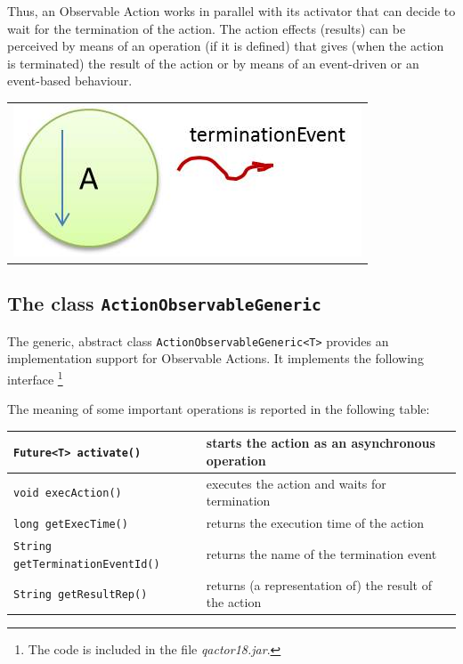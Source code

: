 Thus, an Observable Action works in parallel with its activator that can decide to wait for the termination of the action. The action effects (results) can be perceived by means of an operation (if it is defined) that gives (when the action is terminated) the result of the action or by means of an event-driven or an event-based behaviour.

\begin{center}
\begin{tabular}{ c }
     \includegraphics[scale = 0.5]{img/actionObservable.jpg}\\
\end{tabular}{   }
\end{center}
 

\subsection{The class \texttt{ActionObservableGeneric}}

The generic, abstract class \texttt{ActionObservableGeneric<T>} provides an implementation support for Observable Actions. It implements the following interface \footnote{The code is included in the file \textit{qactor18.jar}.}  



The meaning of some important operations is reported in the following table:

\medskip 
\begin{tabular}{|l|l|}
\hline 
\texttt{Future<T> activate()} & starts the action as an asynchronous operation \\ 
\hline 
\texttt{void execAction()} & executes the action and waits for termination \\ 
\hline 
\texttt{long getExecTime()} & returns the execution time of the action \\ 
\hline 
\texttt{String getTerminationEventId()} & returns the name of the termination event\\ 
\hline 
\texttt{String getResultRep()} & returns (a representation of) the result of the action\\ 
\hline 
\end{tabular} 

